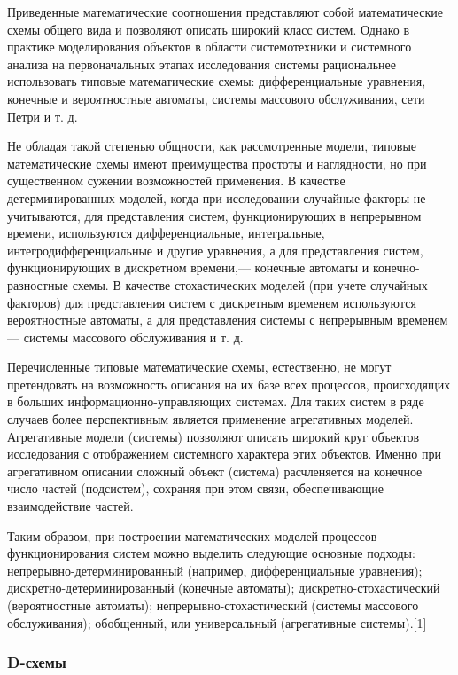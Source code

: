   Приведенные математические соотношения представляют собой математические схемы общего вида и позволяют описать широкий класс систем. Однако в практике моделирования объектов в области системотехники и системного анализа на первоначальных этапах исследования системы рациональнее использовать типовые математические схемы: дифференциальные уравнения, конечные и вероятностные автоматы, системы массового обслуживания, сети Петри и т. д.

  Не обладая такой степенью общности, как рассмотренные модели, типовые математические схемы имеют преимущества простоты и наглядности, но при существенном сужении возможностей применения. В качестве детерминированных моделей, когда при исследовании случайные факторы не учитываются, для представления систем, функционирующих в непрерывном времени, используются дифференциальные, интегральные, интегродифференциальные и другие уравнения, а для представления систем, функционирующих в дискретном времени,— конечные автоматы и конечно-разностные схемы. В качестве стохастических моделей (при учете случайных факторов) для представления систем с дискретным временем используются вероятностные автоматы, а для представления системы с непрерывным временем — системы массового обслуживания и т. д.

  Перечисленные типовые математические схемы, естественно, не могут претендовать на возможность описания на их базе всех процессов, происходящих в больших информационно-управляющих системах. Для таких систем в ряде случаев более перспективным является применение агрегативных моделей. Агрегативные модели (системы) позволяют описать широкий круг объектов исследования с отображением системного характера этих объектов. Именно при агрегативном описании сложный объект (система) расчленяется на конечное число частей (подсистем), сохраняя при этом связи, обеспечивающие взаимодействие частей.

  Таким образом, при построении математических моделей процессов функционирования систем можно выделить следующие основные подходы: непрерывно-детерминированный (например, дифференциальные уравнения); дискретно-детерминированный (конечные автоматы); дискретно-стохастический (вероятностные автоматы); непрерывно-стохастический (системы массового обслуживания); обобщенный, или универсальный (агрегативные системы).[1]

 \subsubsection{D-схемы}

